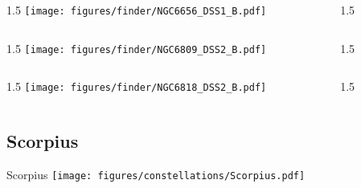 \documentclass[final]{beamer}
\newlength{\colwidth}
\begin{document}

\begin{frame}[t]{}
  \begin{columns}[T]
    \begin{column}{1.5\colwidth}
      \centering
      \texttt{[image: figures/finder/NGC6656\_DSS1\_B.pdf]}
    \end{column}
    \begin{column}{1.5\colwidth}
      \Large
      
    \end{column}
  \end{columns}
  \vspace{\fill}
  \begin{columns}[T]
    \begin{column}{1.5\colwidth}
      \centering
      \texttt{[image: figures/finder/NGC6809\_DSS2\_B.pdf]}
    \end{column}
    \begin{column}{1.5\colwidth}
      \Large
      
    \end{column}
  \end{columns}
\end{frame}


\begin{frame}[t]{}
  \begin{columns}[T]
    \begin{column}{1.5\colwidth}
      \centering
      \texttt{[image: figures/finder/NGC6818\_DSS2\_B.pdf]}
    \end{column}
    \begin{column}{1.5\colwidth}
      \Large
      
    \end{column}
  \end{columns}
  \vspace{\fill}
\end{frame}

\subsection{Scorpius}

\begin{frame}[t]{\LARGE Scorpius}
  \centering
  \texttt{[image: figures/constellations/Scorpius.pdf]}
\end{frame}
\end{document}
